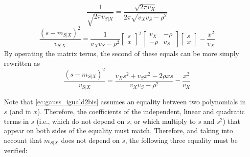 \begin{equation}
\label{ec:gauss_iguald1}
\frac{1}{\sqrt{2\pi v_{S|X}}} = \frac{\sqrt{2\pi v_X}}{{2\pi \sqrt{v_X v_S - \rho^2}}}
\end{equation}
\begin{equation}
\label{ec:gauss_iguald2}
\frac{(s - m_{S|X})^2}{v_{S|X}} = \displaystyle\frac{1}{v_X v_S - \rho^2}\left[\begin{array}{c} s \\ x \end{array}\right]^T\left[\begin{array}{cc} v_X & -\rho \\ -\rho & v_S \end{array}\right] \left[\begin{array}{c} s \\ x \end{array}\right] - \displaystyle\frac{x^2}{v_X}
\end{equation}
By operating the matrix terms, the second of these equals can be more simply rewritten as
\begin{equation}
\label{ec:gauss_iguald2bis}
\frac{(s - m_{S|X})^2}{v_{S|X}} = \displaystyle\frac{v_X s^2 + v_S x^2 - 2 \rho x s}{v_X v_S - \rho^2} - \displaystyle\frac{x^2}{v_X}
\end{equation}

Note that \eqref{ec:gauss_iguald2bis} assumes an equality between two polynomials in $s$ (and in $x$). Therefore, the coefficients of the independent, linear and quadratic terms in $s$ (i.e., which do not depend on $s$, or which multiply to $s$ and $s^2$) that appear on both sides of the equality must match. Therefore, and taking into account that $m_{S|X}$ does not depend on $s$, the following three equality must be verified:

